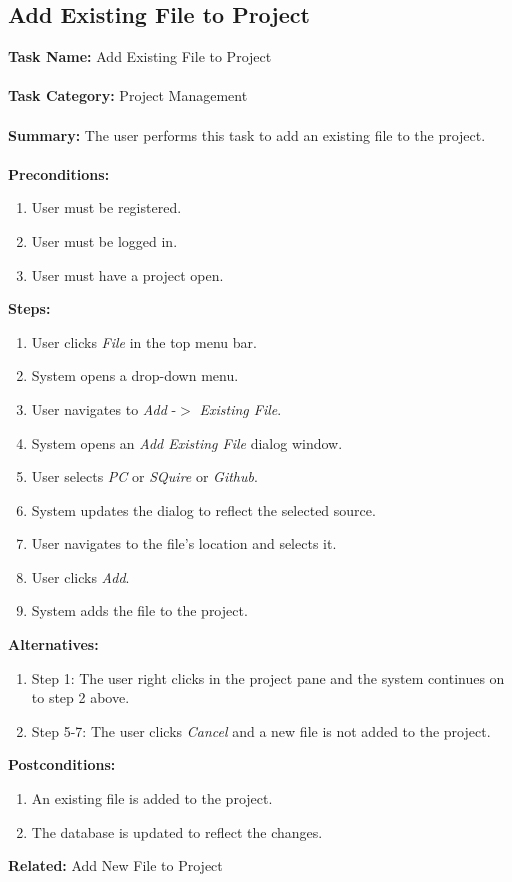 \documentclass[14pt, a4paper]{article}
\begin{document}
\newpage

\subsection{Add Existing File to Project}

\begin{framed}
	\noindent\textbf{Task Name:} Add Existing File to Project \\ \\
	\textbf{Task Category:} Project Management \\ \\
	\textbf{Summary:} The user performs this task to add an existing file to the project. \\ \\
	\textbf{Preconditions:} 
	\begin{enumerate}
		\item User must be registered.
		\item User must be logged in.
		\item User must have a project open.
	\end{enumerate}
	\textbf{Steps:}
	\begin{enumerate}
		\item User clicks \textit{File} in the top menu bar.
		\item System opens a drop-down menu.
		\item User navigates to \textit{Add} -$>$ \textit{Existing File}.
		\item System opens an \textit{Add Existing File} dialog window.
		\item User selects \textit{PC} or \textit{SQuire} or \textit{Github}.
		\item System updates the dialog to reflect the selected source.
		\item User navigates to the file's location and selects it.
		\item User clicks \textit{Add}.
		\item System adds the file to the project.
	\end{enumerate}
	\textbf{Alternatives:} 
	\begin{enumerate}
		\item Step 1: The user right clicks in the project pane and the system continues on to step 2 above.
		\item Step 5-7: The user clicks \textit{Cancel} and a new file is not added to the project.
	\end{enumerate}
	\textbf{Postconditions:}
	\begin{enumerate}
		\item An existing file is added to the project.
		\item The database is updated to reflect the changes.
	\end{enumerate}
	\textbf{Related:} Add New File to Project
\end{framed} 
\end{document}
